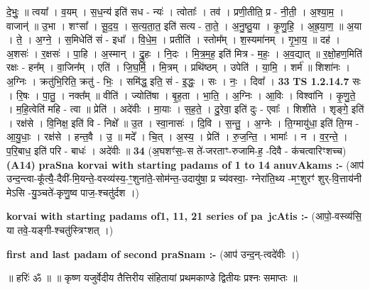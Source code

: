 \documentclass[17pt]{extarticle}
\begin{document}
                  दे॒भुः॒ ॥ त्वया᳚ । व॒यम् । स॒ध॒न्य॑ इति॑ सध - न्यः॑ । त्वोताः᳚ । तव॑ । प्रणी॒तीति॒ प्र - नी॒ती॒ । अ॒श्या॒म॒ । वाजान्॑ ॥ उ॒भा । शꣳसा᳚ । सू॒द॒य॒ । स॒त्य॒ता॒त॒ इति॑ सत्य - ता॒ते॒ । अ॒नु॒ष्ठु॒या । कृ॒णु॒हि॒ । अ॒ह्र॒या॒ण॒ ॥ अ॒या । ते॒ । अ॒ग्ने॒ । स॒मिधेति॑ सं - इधा᳚ । वि॒धे॒म॒ । प्रतीति॑ । स्तोम᳚म् । श॒स्यमा॑नम् । गृ॒भा॒य॒ ॥ दह॑ । अ॒शसः॑ । र॒क्षसः॑ । पा॒हि । अ॒स्मान् । द्रु॒हः । नि॒दः । मि॒त्र॒म॒ह॒ इति॑ मित्र - म॒हः॒ । अ॒व॒द्यात् ॥ र॒क्षो॒हण॒मिति॑ रक्षः - हन᳚म् । वा॒जिन᳚म् । एति॑ । जि॒घ॒र्मि॒ । मि॒त्रम् । प्रथि॑ष्ठम् । उपेति॑ । या॒मि॒ । शर्म॑ ॥ शिशा॑नः । अ॒ग्निः । क्रतु॑भि॒रिति॒ क्रतु॑ - भिः॒ । समि॑द्ध॒ इति॒ सं - इ॒द्धः॒ । सः । नः॒ । दिवा᳚ । \textbf{  33} \newline
                  \newline
                                \textbf{ TS 1.2.14.7} \newline
                  सः । रि॒षः । पा॒तु॒ । नक्त᳚म् ॥ वीति॑ । ज्योति॑षा । बृ॒ह॒ता । भा॒ति॒ । अ॒ग्निः । आ॒विः । विश्वा॑नि । कृ॒णु॒ते॒ । म॒हि॒त्वेति॑ महि - त्वा ॥ प्रेति॑ । अदे॑वीः । मा॒याः । स॒ह॒ते॒ । दु॒रेवा॒ इति॑ दुः - एवाः᳚ । शिशी॑ते । शृङ्गे॒ इति॑ । रक्ष॑से । वि॒निक्ष॒ इति॑ वि - निक्षे᳚ ॥ उ॒त । स्वा॒नासः॑ । दि॒वि । स॒न्तु॒ । अ॒ग्नेः । ति॒ग्मायु॑धा॒ इति॑ ति॒ग्म - आ॒यु॒धाः॒ । रक्ष॑से । हन्त॒वै । उ॒ ॥ मदे᳚ । चि॒त् । अ॒स्य॒ । प्रेति॑ । रु॒ज॒न्ति॒ । भामाः᳚ । न । व॒र॒न्ते॒ । प॒रि॒बाध॒ इति॑ परि - बाधः॑ । अदे॑वीः ॥ \textbf{  34} \newline
                  \newline
                      (अ॒घशꣳ॑सः॒-स ते॑-जरताꣳ-रुजामि-ह॒ -दिवै - क॑चत्वारिꣳशच्च)  \textbf{(A14)} \newline \newline
\textbf{praSna korvai with starting padams of 1 to 14 anuvAkams :-} \newline
(आप॑ उन्द॒न्त्वा-कू᳚त्यै॒-दैवी॑-मि॒यन्ते॒-वस्व्य॑स्य॒-ꣳ॒शुना॑ते॒-सोम॑न्त॒-उदायु॑षा॒ प्र च्य॑वस्वा॒- ग्नेरा॑ति॒थ्य -मꣳ॒॒शुरꣳ॑ शुर्-वि॒त्ताय॑नी मेऽसि -यु॒ञ्चते॑-कृणु॒ष्व पाज॒-श्चतु॑र्दश ।) \newline

\textbf{korvai with starting padams of1, 11, 21 series of pa~jcAtis :-} \newline
(आपो॒-वस्व्य॑सि॒ या तवे॒-यङ्गी-श्चतु॑स्त्रिꣳशत् ।) \newline

\textbf{first and last padam of second praSnam :-} \newline
(आप॑ उन्द॒न्-त्वदे॑वीः ।) \newline 


॥ हरिः॑ ॐ ॥
॥ कृष्ण यजुर्वेदीय तैत्तिरीय संहितायां प्रथमकाण्डे द्वितीयः प्रश्नः समाप्तः ॥ \newline
\pagebreak
\pagebreak
        
\end{document}
